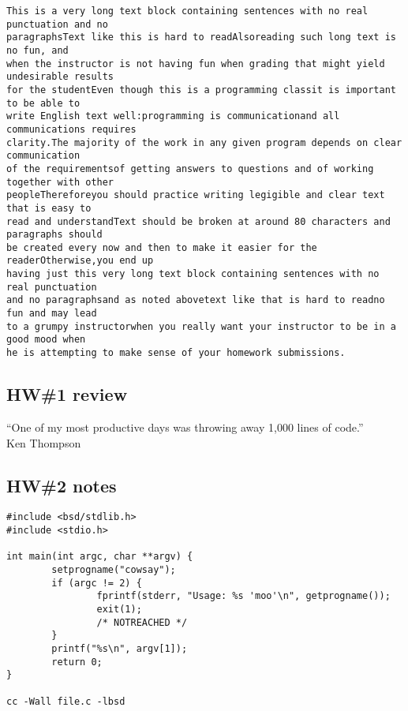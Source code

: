 \documentclass[xga]{xdvislides}
\begin{document}
\begin{verbatim}
This is a very long text block containing sentences with no real punctuation and no
paragraphsText like this is hard to readAlsoreading such long text is no fun, and
when the instructor is not having fun when grading that might yield undesirable results
for the studentEven though this is a programming classit is important to be able to
write English text well:programming is communicationand all communications requires
clarity.The majority of the work in any given program depends on clear communication
of the requirementsof getting answers to questions and of working together with other
peopleThereforeyou should practice writing legigible and clear text that is easy to
read and understandText should be broken at around 80 characters and paragraphs should
be created every now and then to make it easier for the readerOtherwise,you end up
having just this very long text block containing sentences with no real punctuation
and no paragraphsand as noted abovetext like that is hard to readno fun and may lead
to a grumpy instructorwhen you really want your instructor to be in a good mood when
he is attempting to make sense of your homework submissions.
\end{verbatim}

\subsection{HW\#1 review}

\vspace*{\fill}
\begin{center}
\Huge
``One of my most productive days was throwing away 1,000 lines of code.''
\Normalsize
\\

Ken Thompson
\end{center}
\vspace*{\fill}

\subsection{HW\#2 notes}

\begin{verbatim}
#include <bsd/stdlib.h>
#include <stdio.h>

int main(int argc, char **argv) {
        setprogname("cowsay");
        if (argc != 2) {
                fprintf(stderr, "Usage: %s 'moo'\n", getprogname());
                exit(1);
                /* NOTREACHED */
        }
        printf("%s\n", argv[1]);
        return 0;
}

cc -Wall file.c -lbsd
\end{verbatim}
\end{document}
